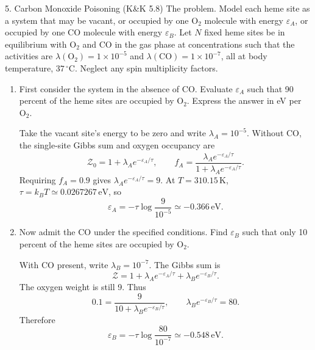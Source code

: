 \documentclass[11pt]{article}
\begin{document}
\begin{problem}{5. Carbon Monoxide Poisoning (K\&K 5.8)}
The problem.
Model each heme site as a system that may be vacant, or occupied by one \(\mathrm{O}_2\) molecule with energy \(\varepsilon_A\), or occupied by one CO molecule with energy \(\varepsilon_B\).
Let \(N\) fixed heme sites be in equilibrium with \(\mathrm{O}_2\) and CO in the gas phase at concentrations such that the activities are \(\lambda(\mathrm{O}_2)=1\times10^{-5}\) and \(\lambda(\mathrm{CO})=1\times10^{-7}\), all at body temperature, \(37\,{}^\circ\mathrm{C}\).
Neglect any spin multiplicity factors.
\begin{enumerate}[label=(\alph*)]
  \item First consider the system in the absence of CO.
  Evaluate \(\varepsilon_A\) such that 90 percent of the heme sites are occupied by \(\mathrm{O}_2\).
  Express the answer in eV per \(\mathrm{O}_2\).
  \begin{answer}
Take the vacant site's energy to be zero and write \(\lambda_A=10^{-5}\). Without CO, the single-site Gibbs sum and oxygen occupancy are
\begin{equation}
\label{eq:p5-oxygen-occupancy}
\mathcal Z_0=1+\lambda_Ae^{-\varepsilon_A/\tau},
\qquad f_A=\frac{\lambda_Ae^{-\varepsilon_A/\tau}}{1+\lambda_Ae^{-\varepsilon_A/\tau}}.
\end{equation}
Requiring \(f_A=0.9\) gives \(\lambda_Ae^{-\varepsilon_A/\tau}=9\). At \(T=310.15\,\mathrm K\), \(\tau=k_BT\simeq0.0267267\,\mathrm{eV}\), so
\begin{equation}
\label{eq:p5-oxygen-energy}
\boxed{\varepsilon_A=-\tau\log\frac{9}{10^{-5}}\simeq-0.366\,\mathrm{eV}}.
\end{equation}
\end{answer}
\item Now admit the CO under the specified conditions.
  Find \(\varepsilon_B\) such that only 10 percent of the heme sites are occupied by \(\mathrm{O}_2\).
\begin{answer}
With CO present, write \(\lambda_B=10^{-7}\). The Gibbs sum is
\begin{equation}
\label{eq:p5-both-gases}
\mathcal Z=1+\lambda_Ae^{-\varepsilon_A/\tau}+\lambda_Be^{-\varepsilon_B/\tau}.
\end{equation}
The oxygen weight is still 9. Thus
\begin{equation}
\label{eq:p5-co-weight}
0.1=\frac{9}{10+\lambda_Be^{-\varepsilon_B/\tau}},
\qquad \lambda_Be^{-\varepsilon_B/\tau}=80.
\end{equation}
Therefore
\begin{equation}
\label{eq:p5-co-energy}
\boxed{\varepsilon_B=-\tau\log\frac{80}{10^{-7}}\simeq-0.548\,\mathrm{eV}}.
\end{equation}
\end{answer}
\end{enumerate}
\end{problem}
\end{document}
